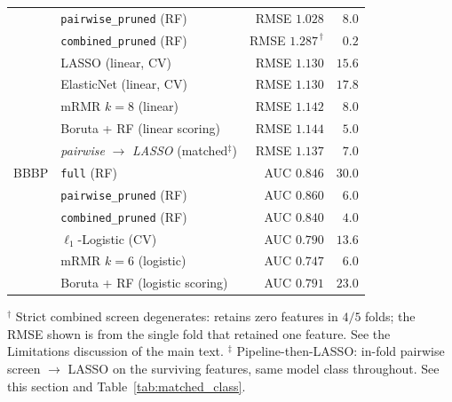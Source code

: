 \documentclass[11pt,a4paper]{article}
\begin{document}
\begin{table}[h]
\begin{tabular}{llrr}
              & \texttt{pairwise\_pruned} (RF) & RMSE $1.028$ & $\phantom{0}8.0$\\
              & \texttt{combined\_pruned} (RF) & RMSE $1.287^{\,\dagger}$ & $\phantom{0}0.2$\\
              & LASSO (linear, CV)        & RMSE $1.130$ & $15.6$\\
              & ElasticNet (linear, CV)   & RMSE $1.130$ & $17.8$\\
              & mRMR $k{=}8$ (linear)     & RMSE $1.142$ & $\phantom{0}8.0$\\
              & Boruta + RF (linear scoring) & RMSE $1.144$ & $\phantom{0}5.0$\\
              & \emph{pairwise} $\to$ \emph{LASSO} (matched$^{\ddagger}$) & RMSE $1.137$ & $\phantom{0}7.0$\\
\midrule
BBBP & \texttt{full} (RF)                 & AUC $0.846$ & $30.0$\\
     & \texttt{pairwise\_pruned} (RF)     & AUC $0.860$ & $\phantom{0}6.0$\\
     & \texttt{combined\_pruned} (RF)     & AUC $0.840$ & $\phantom{0}4.0$\\
     & $\ell_1$-Logistic (CV)             & AUC $0.790$ & $13.6$\\
     & mRMR $k{=}6$ (logistic)            & AUC $0.747$ & $\phantom{0}6.0$\\
     & Boruta + RF (logistic scoring)     & AUC $0.791$ & $23.0$\\
\bottomrule
\end{tabular}

\vspace{0.5em}
\noindent\small{$^\dagger$ Strict combined screen degenerates: retains zero features in $4/5$ folds; the RMSE shown is from the single fold that retained one feature. See the Limitations discussion of the main text.}
\noindent\small{$^\ddagger$ Pipeline-then-LASSO: in-fold pairwise screen $\to$ LASSO on the surviving features, same model class throughout. See this section and Table~\ref{tab:matched_class}.}
\end{table}
\end{document}
